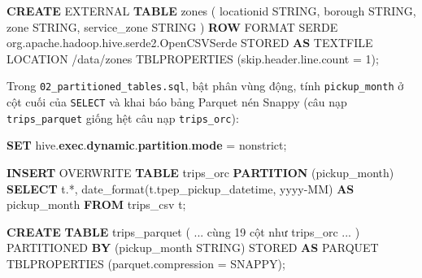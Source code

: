 \documentclass[
  12pt,
  a4paper,
]{report}
\newenvironment{Shaded}{}{}
\newcommand{\DataTypeTok}[1]{\textcolor[rgb]{0.56,0.13,0.00}{#1}}
\newcommand{\DecValTok}[1]{\textcolor[rgb]{0.25,0.63,0.44}{#1}}
\newcommand{\KeywordTok}[1]{\textcolor[rgb]{0.00,0.44,0.13}{\textbf{#1}}}
\newcommand{\NormalTok}[1]{#1}
\newcommand{\OperatorTok}[1]{\textcolor[rgb]{0.40,0.40,0.40}{#1}}
\newcommand{\StringTok}[1]{\textcolor[rgb]{0.25,0.44,0.63}{#1}}
\begin{document}
\begin{Shaded}
\begin{Highlighting}[]
\KeywordTok{CREATE}\NormalTok{ EXTERNAL }\KeywordTok{TABLE}\NormalTok{ zones (}
\NormalTok{  locationid STRING, borough STRING, }\DataTypeTok{zone}\NormalTok{ STRING, service\_zone STRING}
\NormalTok{)}
\KeywordTok{ROW}\NormalTok{ FORMAT SERDE }\StringTok{\textquotesingle{}org.apache.hadoop.hive.serde2.OpenCSVSerde\textquotesingle{}}
\NormalTok{STORED }\KeywordTok{AS}\NormalTok{ TEXTFILE}
\NormalTok{LOCATION }\StringTok{\textquotesingle{}/data/zones\textquotesingle{}}
\NormalTok{TBLPROPERTIES (}\StringTok{\textquotesingle{}skip.header.line.count\textquotesingle{}} \OperatorTok{=} \StringTok{\textquotesingle{}1\textquotesingle{}}\NormalTok{);}
\end{Highlighting}
\end{Shaded}

Trong
\texttt{02\_}\allowbreak{}\texttt{partitioned\_}\allowbreak{}\texttt{tables.}\allowbreak{}\texttt{sql}\allowbreak{},
bật phân vùng động, tính \texttt{pickup\_month} ở cột cuối của
\texttt{SELECT} và khai báo bảng Parquet nén Snappy (câu nạp
\texttt{trips\_parquet} giống hệt câu nạp \texttt{trips\_orc}):

\begin{Shaded}
\begin{Highlighting}[]
\KeywordTok{SET}\NormalTok{ hive.}\KeywordTok{exec}\NormalTok{.}\KeywordTok{dynamic}\NormalTok{.}\KeywordTok{partition}\NormalTok{.}\KeywordTok{mode} \OperatorTok{=}\NormalTok{ nonstrict;}

\KeywordTok{INSERT}\NormalTok{ OVERWRITE }\KeywordTok{TABLE}\NormalTok{ trips\_orc }\KeywordTok{PARTITION}\NormalTok{ (pickup\_month)}
\KeywordTok{SELECT}\NormalTok{ t.}\OperatorTok{*}\NormalTok{,}
\NormalTok{       date\_format(t.tpep\_pickup\_datetime, }\StringTok{\textquotesingle{}yyyy{-}MM\textquotesingle{}}\NormalTok{) }\KeywordTok{AS}\NormalTok{ pickup\_month}
\KeywordTok{FROM}\NormalTok{ trips\_csv t;}

\KeywordTok{CREATE} \KeywordTok{TABLE}\NormalTok{ trips\_parquet ( }\OperatorTok{..}\NormalTok{. cùng }\DecValTok{19}\NormalTok{ cột như trips\_orc }\OperatorTok{..}\NormalTok{. )}
\NormalTok{PARTITIONED }\KeywordTok{BY}\NormalTok{ (pickup\_month STRING)}
\NormalTok{STORED }\KeywordTok{AS}\NormalTok{ PARQUET}
\NormalTok{TBLPROPERTIES (}\StringTok{\textquotesingle{}parquet.compression\textquotesingle{}} \OperatorTok{=} \StringTok{\textquotesingle{}SNAPPY\textquotesingle{}}\NormalTok{);}
\end{Highlighting}
\end{Shaded}
\end{document}
